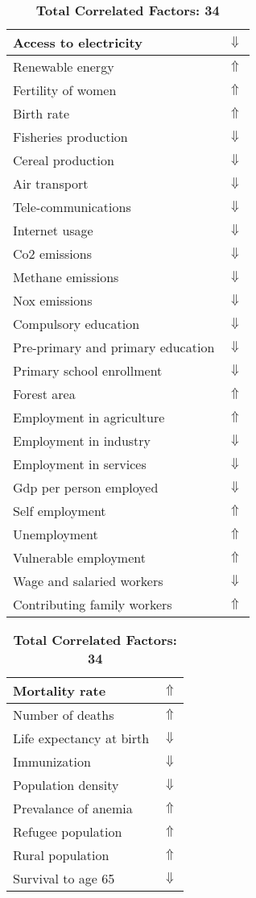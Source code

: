 \documentclass[12pt,notitlepage,oneside]{report}
\begin{document}
\begin{table}[!htb]
\caption{\textbf{Specific Disease Is: Marburg virus disease $\Uparrow$}}
\centering
\label{Correlated Socio-economic Factors0}
\begin{tabular}{|l|l|}
\hline
Access to electricity & $\Downarrow$\\ \hline
Renewable energy & $\Uparrow$\\ \hline
Fertility of women & $\Uparrow$\\ \hline
Birth rate & $\Uparrow$\\ \hline
Fisheries production & $\Downarrow$\\ \hline
Cereal production & $\Downarrow$\\ \hline
Air transport  & $\Downarrow$\\ \hline
Tele-communications & $\Downarrow$\\ \hline
Internet usage & $\Downarrow$\\ \hline
Co2 emissions & $\Downarrow$\\ \hline
Methane emissions & $\Downarrow$\\ \hline
Nox emissions & $\Downarrow$\\ \hline
Compulsory education & $\Downarrow$\\ \hline
Pre-primary and primary education & $\Downarrow$\\ \hline
Primary school enrollment & $\Downarrow$\\ \hline
Forest area & $\Uparrow$\\ \hline
Employment in agriculture & $\Uparrow$\\ \hline
Employment in industry & $\Downarrow$\\ \hline
Employment in services & $\Downarrow$\\ \hline
Gdp per person employed & $\Downarrow$\\ \hline
Self employment & $\Uparrow$\\ \hline
Unemployment & $\Uparrow$\\ \hline
Vulnerable employment & $\Uparrow$\\ \hline
Wage and salaried workers & $\Downarrow$\\ \hline
Contributing family workers & $\Uparrow$\\ \hline
\end{tabular}
\begin{tabular}{|l|l|}
\hline
Mortality rate & $\Uparrow$\\ \hline
Number of deaths & $\Uparrow$\\ \hline
Life expectancy at birth & $\Downarrow$\\ \hline
Immunization & $\Downarrow$\\ \hline
Population density & $\Downarrow$\\ \hline
Prevalance of anemia & $\Uparrow$\\ \hline
Refugee population & $\Uparrow$\\ \hline
Rural population & $\Uparrow$\\ \hline
Survival to age 65 & $\Downarrow$\\ \hline
\end{tabular}
\caption*{\textbf{Total Correlated Factors: 34}}
\end{table}
\end{document}
